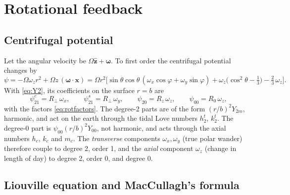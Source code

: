 \documentclass[11pt,a4paper]{article}
\newcommand{\x}{\mathbf{x}}
\numberwithin{equation}{section}
\begin{document}
\section{Rotational feedback}
\label{sec:rotation}

\subsection{Centrifugal potential}

Let the angular velocity be $\Omega\hat{\mathbf z}+\bm{\omega}$. To first order
the centrifugal potential changes by
\begin{equation}
\psi = -\Omega\omega_{z}r^{2} + \Omega z\,(\bm{\omega}\cdot\x)
= \Omega r^{2}\Big[\sin\theta\cos\theta\,(\omega_{x}\cos\varphi+\omega_{y}\sin\varphi)
+ \omega_{z}\big(\cos^{2}\theta-\tfrac13\big) - \tfrac23\,\omega_{z}\Big].
\end{equation}
With \eqref{eq:Y2}, its coefficients on the surface $r=b$ are
\begin{equation}
\psi^{c}_{21} = R_{\perp}\,\omega_{x},\qquad
\psi^{s}_{21} = R_{\perp}\,\omega_{y},\qquad
\psi_{20} = R_{z}\,\omega_{z},\qquad
\psi_{00} = R_{0}\,\omega_{z},
\label{eq:centrifugal}
\end{equation}
with the factors \eqref{eq:rotfactors}. The degree-2 parts are of the form
$(r/b)^{2}Y_{2m}$, harmonic, and act on the earth through the tidal Love numbers
$h^{t}_{2}$, $k^{t}_{2}$. The degree-0 part is $\psi_{00}(r/b)^{2}Y_{00}$, not
harmonic, and acts through the axial numbers $h_{c}$, $k_{c}$ and $m_{c}$.
The \emph{transverse} components $\omega_{x},\omega_{y}$ (true polar wander)
therefore couple to degree 2, order 1, and the \emph{axial} component
$\omega_{z}$ (change in length of day) to degree 2, order 0, and degree 0.

\subsection{Liouville equation and MacCullagh's formula}
\end{document}
